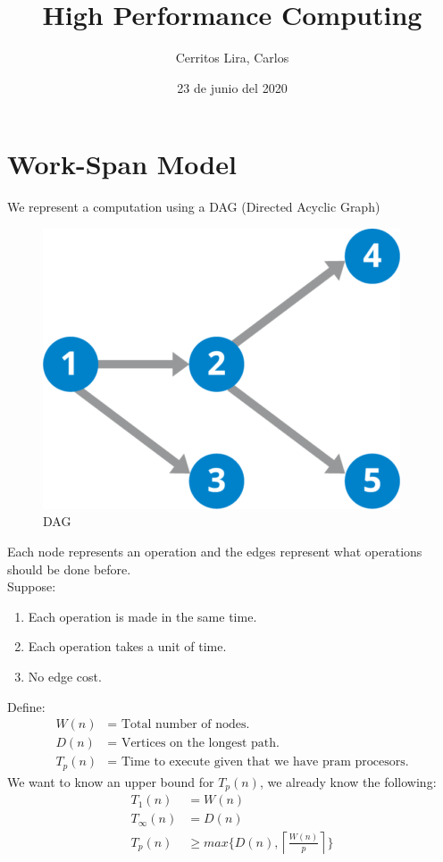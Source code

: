 \documentclass{article}
\title{High Performance Computing}
\author{Cerritos Lira, Carlos}
\date{23 de junio del 2020}
\newcommand{\ceil}[1]{\left \lceil #1 \right \rceil}
\begin{document}
\maketitle
\section*{Work-Span Model}
We represent a computation using a DAG (Directed Acyclic Graph)
\begin{figure}[H]
    \centering
    \includegraphics[scale=0.4]{images/dag_generic.png}
    \caption{DAG}
    \label{}
\end{figure}
Each node represents an operation and the edges represent what operations should be done before. \\
Suppose:
\begin{enumerate}
    \item Each operation is made in the same time.
    \item Each operation takes a unit of time. 
    \item No edge cost.
\end{enumerate}
Define:
\begin{align*}
    W(n) &= \text{ Total number of nodes.} \\
    D(n) &= \text{ Vertices on the longest path.} \\
    T_p(n) &= \text{ Time to execute given that we have pram procesors.}
\end{align*}
We want to know an upper bound for $T_p(n)$, we already know the following:
\begin{align*}
    T_1(n) &= W(n) \\
    T_\infty(n) &= D(n) \\
    T_p(n) &\geq max \{ D(n), \ceil{\tfrac{W(n)}{p}} \} 
\end{align*}
\end{document}
